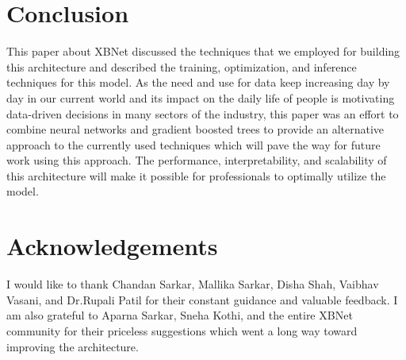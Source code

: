 \documentclass[review]{elsarticle}
\begin{document}
\section{Conclusion}
This paper about XBNet discussed the techniques that we employed for building this architecture and described the training, optimization, and inference techniques for this model. As the need and use for data keep increasing day by day in our current world and its impact on the daily life of people is motivating data-driven decisions in many sectors of the industry, this paper was an effort to combine neural networks and gradient boosted trees to provide an alternative approach to the currently used techniques which will pave the way for future work using this approach. The performance, interpretability, and scalability of this architecture will make it possible for professionals to optimally utilize the model.

\section{Acknowledgements}
I would like to thank Chandan Sarkar, Mallika Sarkar, Disha Shah, Vaibhav Vasani, and Dr.Rupali Patil for their constant guidance and valuable feedback. I am also grateful to Aparna Sarkar, Sneha Kothi, and the entire XBNet community for their priceless suggestions which went a long way toward improving the architecture. 




\end{document}
